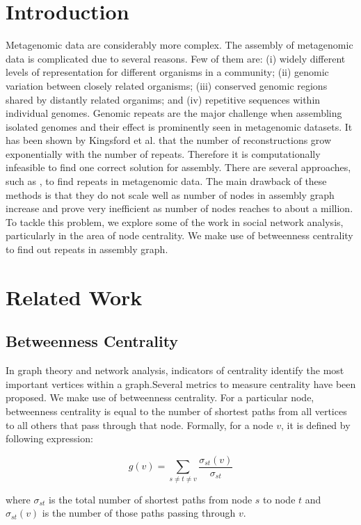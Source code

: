 \documentclass[runningheads,a4paper]{llncs}
\begin{document}
\section{Introduction}

Metagenomic data are considerably more complex. The assembly of metagenomic data is complicated due to several reasons. Few of them are: (i) widely different levels of representation for different organisms in a community; (ii) genomic variation between closely related organisms; (iii) conserved genomic regions shared by distantly related organims; and (iv) repetitive sequences within individual genomes. Genomic repeats are the major challenge when assembling isolated genomes and their effect is prominently seen in metagenomic datasets. It has been shown by Kingsford et al.\cite{kingsford} that the number of reconstructions grow exponentially with the number of repeats. Therefore it is computationally infeasible to find one correct solution for assembly. There are several approaches, such as \cite{bambus}, to find repeats in metagenomic data. The main drawback of these methods is that they do not scale well as number of nodes in assembly graph increase and prove very inefficient as number of nodes reaches to about a million. To tackle this problem, we explore some of the work in social network analysis, particularly in the area of node centrality. We make use of betweenness centrality to find out repeats in assembly graph. 

\section{Related Work}

\subsection*{Betweenness Centrality}
In graph theory and network analysis, indicators of centrality identify the most important vertices within a graph.Several metrics to measure centrality have been proposed. We make use of betweenness centrality. For a particular node, betweenness centrality is equal to the number of shortest paths from all vertices to all others that pass through that node. Formally, for a node $v$, it is defined by following expression:

$$g(v) = \sum_{s \neq t \neq v} \frac{\sigma_{st}(v)}{\sigma_{st}}$$

where $\sigma_{st}$ is the total number of shortest paths from node $s$ to node $t$ and $\sigma_{st}(v)$ is the number of those paths passing through $v$.
\end{document}
